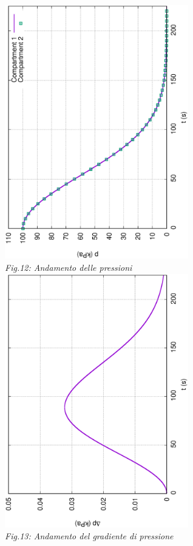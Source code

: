 \documentclass{article}
\begin{document}
        \begin{center}
            \includegraphics[width=0.6\textwidth, angle=-90]{MUL2/p_ES2_5.eps}\\ 
            \textit{Fig.12: Andamento delle pressioni} \\ 
            \includegraphics[width=0.6\textwidth, angle=-90]{MUL2/Dp_ES2_5.eps}\\
            \textit{Fig.13: Andamento del gradiente di pressione}\\
        \end{center}
\end{document}
